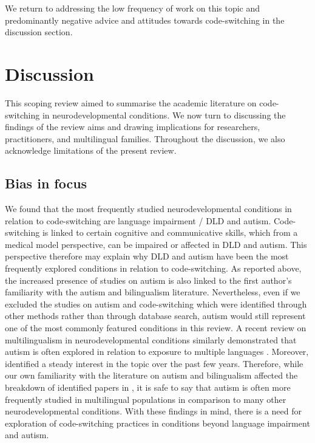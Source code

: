 \documentclass[output=paper]{langscibook}
\begin{document}
We return to addressing the low frequency of work on this topic and predominantly negative advice and attitudes towards code-switching in the discussion section.

\section{Discussion}

This scoping review aimed to summarise the academic literature on code-switching in neurodevelopmental conditions. We now turn to discussing the findings of the review aims and drawing implications for researchers, practitioners, and multilingual families. Throughout the discussion, we also acknowledge limitations of the present review.

\subsection{Bias in focus}

We found that the most frequently studied neurodevelopmental conditions in relation to code-switching are language impairment / DLD and autism. Code-switching is linked to certain cognitive and communicative skills, which from a medical model perspective, can be impaired or affected in DLD and autism. This perspective therefore may explain why DLD and autism have been the most frequently explored conditions in relation to code-switching. As reported above, the increased presence of studies on autism is also linked to the first author’s familiarity with the autism and bilingualism literature. Nevertheless, even if we excluded the studies on autism and code-switching which were identified through other methods rather than through database search, autism would still represent one of the most commonly featured conditions in this review. A recent review on multilingualism in neurodevelopmental conditions similarly demonstrated that autism is often explored in relation to exposure to multiple languages \citep{UljarevićEtAl2016}. Moreover, \citet{PrévostTuller2021} identified a steady interest in the topic over the past few years. Therefore, while our own familiarity with the literature on autism and bilingualism affected the breakdown of identified papers in , it is safe to say that autism is often more frequently studied in multilingual populations in comparison to many other neurodevelopmental conditions. With these findings in mind, there is a need for exploration of code-switching practices in conditions beyond language impairment and autism.
\end{document}
